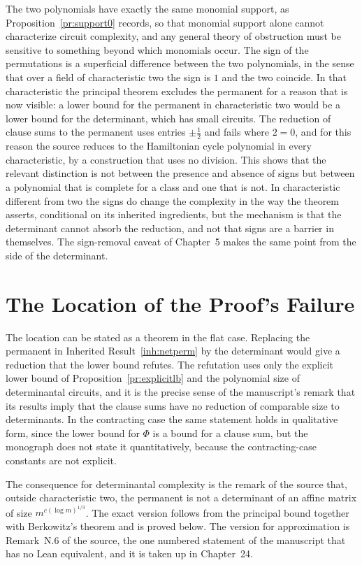 \documentclass[11pt,letterpaper]{report}
\theoremstyle{plain}
\theoremstyle{definition}
\theoremstyle{remark}
\begin{document}
The two polynomials have exactly the same monomial support, as Proposition~\ref{pr:support0} records, so that monomial support alone cannot characterize circuit complexity, and any general theory of obstruction must be sensitive to something beyond which monomials occur. The sign of the permutations is a superficial difference between the two polynomials, in the sense that over a field of characteristic two the sign is $1$ and the two coincide. In that characteristic the principal theorem excludes the permanent for a reason that is now visible: a lower bound for the permanent in characteristic two would be a lower bound for the determinant, which has small circuits. The reduction of clause sums to the permanent uses entries $\pm\tfrac12$ and fails where $2=0$, and for this reason the source reduces to the Hamiltonian cycle polynomial in every characteristic, by a construction that uses no division. This shows that the relevant distinction is not between the presence and absence of signs but between a polynomial that is complete for a class and one that is not. In characteristic different from two the signs do change the complexity in the way the theorem asserts, conditional on its inherited ingredients, but the mechanism is that the determinant cannot absorb the reduction, and not that signs are a barrier in themselves. The sign-removal caveat of Chapter~5 makes the same point from the side of the determinant.

\section{The Location of the Proof's Failure}

The location can be stated as a theorem in the flat case. Replacing the permanent in Inherited Result~\ref{inh:netperm} by the determinant would give a reduction that the lower bound refutes. The refutation uses only the explicit lower bound of Proposition~\ref{pr:explicitlb} and the polynomial size of determinantal circuits, and it is the precise sense of the manuscript's remark that its results imply that the clause sums have no reduction of comparable size to determinants. In the contracting case the same statement holds in qualitative form, since the lower bound for $\Phi$ is a bound for a clause sum, but the monograph does not state it quantitatively, because the contracting-case constants are not explicit.

The consequence for determinantal complexity is the remark of the source that, outside characteristic two, the permanent is not a determinant of an affine matrix of size $m^{c(\log m)^{1/3}}$. The exact version follows from the principal bound together with Berkowitz's theorem and is proved below. The version for approximation is Remark~N.6 of the source, the one numbered statement of the manuscript that has no Lean equivalent, and it is taken up in Chapter~24.
\end{document}
